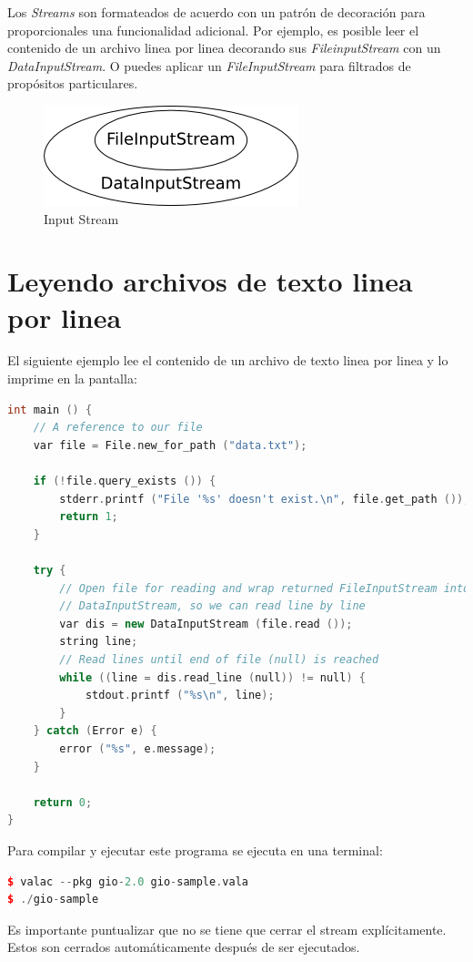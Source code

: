 \documentclass[12pt,twoside]{book}
\begin{document}
Los \textit{Streams} son formateados de acuerdo con un patrón de decoración para proporcionales una funcionalidad adicional. Por ejemplo, es posible leer el contenido de un archivo linea por linea decorando sus\textit{ FileinputStream} con un \textit{DataInputStream}. O puedes aplicar un \textit{FileInputStream} para filtrados de propósitos particulares.

\begin{figure}
	\centering
	\includegraphics[width=0.6\linewidth]{streams-decorator-pattern.png}
	\caption{Input Stream}
	\label{fig0010}
\end{figure}


\section{Leyendo archivos de texto linea por linea}

El siguiente ejemplo lee el contenido de un archivo de texto linea por linea y lo imprime en la pantalla:


\begin{lstlisting}[language=C++]
int main () {
	// A reference to our file
	var file = File.new_for_path ("data.txt");

	if (!file.query_exists ()) {
		stderr.printf ("File '%s' doesn't exist.\n", file.get_path ());
		return 1;
	}

	try {
		// Open file for reading and wrap returned FileInputStream into a
		// DataInputStream, so we can read line by line
		var dis = new DataInputStream (file.read ());
		string line;
		// Read lines until end of file (null) is reached
		while ((line = dis.read_line (null)) != null) {
			stdout.printf ("%s\n", line);
		}
	} catch (Error e) {
		error ("%s", e.message);
	}

	return 0;
}
\end{lstlisting}

Para compilar y ejecutar este programa se ejecuta en una terminal:
\begin{lstlisting}[language=C++]
$ valac --pkg gio-2.0 gio-sample.vala
$ ./gio-sample
\end{lstlisting}

Es importante puntualizar que no se tiene que cerrar el stream explícitamente. Estos son cerrados automáticamente después de ser ejecutados.
\end{document}
